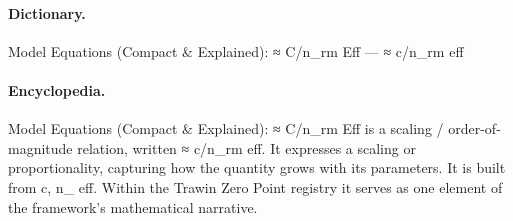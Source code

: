 \paragraph{Dictionary.}
Model Equations (Compact \& Explained): ≈ C/n\_rm Eff — ≈ c/n\_rm eff

\paragraph{Encyclopedia.}
Model Equations (Compact \& Explained): ≈ C/n\_rm Eff is a scaling / order-of-magnitude relation, written ≈ c/n\_rm eff. It expresses a scaling or proportionality, capturing how the quantity grows with its parameters. It is built from c, n\_ eff. Within the Trawin Zero Point registry it serves as one element of the framework's mathematical narrative.
